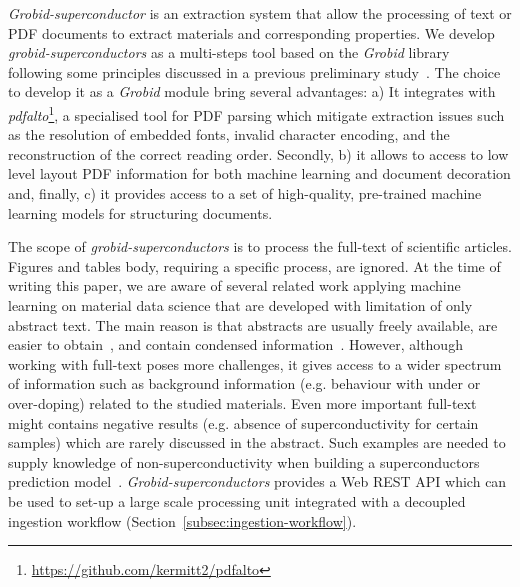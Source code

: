 \documentclass{article}
\begin{document}
\textit{Grobid-superconductor} is an extraction system that allow the processing of text or PDF documents to extract materials and corresponding properties. 
We develop \textit{grobid-superconductors} as a multi-steps tool based on the \textit{Grobid} library~\cite{GROBID} following some principles discussed in a previous preliminary study~\cite{foppiano:hal-02870896}.  
The choice to develop it as a \textit{Grobid} module bring several advantages: a) It integrates with \textit{pdfalto}\footnote{\url{https://github.com/kermitt2/pdfalto}}, a specialised tool for PDF parsing which mitigate extraction issues such as the resolution of embedded fonts, invalid character encoding, and the reconstruction of the correct reading order. 
Secondly, b) it allows to access to low level layout PDF information for both machine learning and document decoration and, finally, c) it provides access to a set of high-quality, pre-trained machine learning models for structuring documents.

The scope of \textit{grobid-superconductors} is to process the full-text of scientific articles. Figures and tables body, requiring a specific process, are ignored.
At the time of writing this paper, we are aware of several related work applying machine learning on material data science that are developed with limitation of  only abstract text.
The main reason is that abstracts are usually freely available, are easier to obtain~\cite{kononova_text-mined_2019}, and contain condensed information~\cite{yamaguchi-etal-2020-sc, court_magnetic_2020}. 
However, although working with full-text poses more challenges, it gives access to a wider spectrum of information such as background information (e.g. behaviour with under or over-doping) related to the studied materials. Even more important full-text might contains negative results (e.g. absence of superconductivity for certain samples) which are rarely discussed in the abstract. 
Such examples are needed to supply knowledge of non-superconductivity when building a superconductors prediction model~\cite{stanev_machine_2017}. 
\textit{Grobid-superconductors} provides a Web REST API which can be used to set-up a large scale processing unit integrated with a decoupled ingestion workflow (Section~\ref{subsec:ingestion-workflow}).
\end{document}
